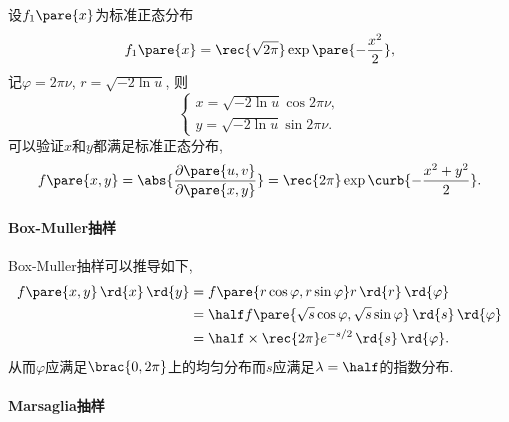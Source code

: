 \documentclass[hidelinks]{ctexart}
\begin{document}

\begin{sample}
    \begin{ex}
        设$f_1\pare{x}$为标准正态分布
        \[ f_1\pare{x} = \rec{\sqrt{2\pi}}\exp\pare{-\frac{x^2}{2}}, \]
        记$\varphi = 2\pi \nu$, $r = \sqrt{-2\ln u}$, 则
        \[ \begin{cases}
            x = \sqrt{-2\ln u}\cos 2\pi \nu,\\
            y = \sqrt{-2\ln u}\sin 2\pi \nu.
        \end{cases} \]
        可以验证$x$和$y$都满足标准正态分布,
        \[ f\pare{x,y} = \abs{\frac{\partial \pare{u,v}}{\partial \pare{x,y}}} = \rec{2\pi} \exp\curb{-\frac{x^2+y^2}{2}}. \]
    \end{ex}
\end{sample}

\paragraph{Box-Muller抽样} %
\label{par:box_muller抽样}

Box-Muller抽样可以推导如下,
\begin{align*}
    f\pare{x,y}\,\rd{x}\,\rd{y} &= f\pare{r\cos\varphi,r\sin\varphi} r\,\rd{r}\,\rd{\varphi} \\
    &= \half f\pare{\sqrt{s} \cos\varphi, \sqrt{s}\sin\varphi}\,\rd{s}\,\rd{\varphi} \\
    &= \half \times \rec{2\pi} e^{-s/2}\,\rd{s}\,\rd{\varphi}.
\end{align*}
从而$\varphi$应满足$\brac{0,2\pi}$上的均匀分布而$s$应满足$\displaystyle \lambda = \half$的指数分布.


\paragraph{Marsaglia抽样} %
\label{par:marsaglia抽样}
\end{document}
